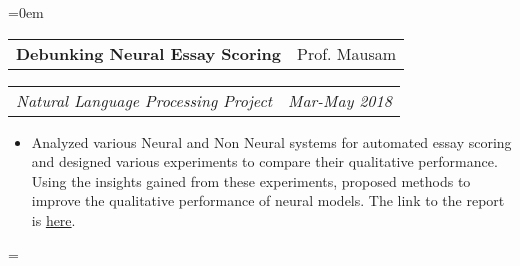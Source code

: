 \documentclass{article}
\makeatletter
\newenvironment{longversion}{}{} %
\newenvironment{absolutelynopagebreak}
  {\par\nobreak\vfil\penalty0\vfilneg
   \vtop\bgroup}
  {\par\xdef\tpd{\the\prevdepth}\egroup
   \prevdepth=\tpd}
\newcommand{\headerrow}[2]
{\begin{tabular*}{\linewidth}{l@{\extracolsep{\fill}}r}
    #1 &
    #2 \\
\end{tabular*}}
\makeatother
\begin{document}
\begin{absolutelynopagebreak}
\begin{longversion}
\begin{list} {}{\leftmargin=0em}
\item[]
\headerrow {\textbf{Debunking Neural Essay Scoring}}{Prof. Mausam}
\headerrow {\emph{Natural Language Processing Project}}{\emph{Mar-May 2018}}
\begin{itemize} \item[] 
Analyzed various Neural and Non Neural systems for automated essay scoring and designed various experiments to compare their qualitative performance. Using the insights gained from these experiments, proposed methods to improve the qualitative performance of neural models. The link to the report is \href{https://www.cse.iitd.ac.in/~cs1150262/nlp.pdf}{here}.
\end{itemize}






\end{list}
\end{longversion}
\end{absolutelynopagebreak}
\end{document}
